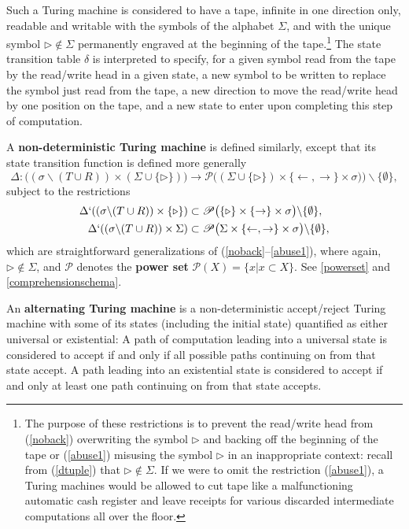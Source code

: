 \documentclass[letterpaper]{article}
\newcommand{\Axiom}{{\large\Bearing}}
\newcommand{\AxiomSchema}{{\large\LooseBearing}}
\begin{document}
\begin{remark}
Such a Turing machine is considered to have a tape, infinite in one direction only, readable and writable with the symbols of the alphabet $\Sigma$, and with the unique symbol \mbox{$\triangleright\notin\Sigma$} permanently engraved at the beginning of the tape.\footnote{The purpose of these restrictions is  to prevent the read/write head from (\ref{noback}) overwriting the symbol $\triangleright$ and backing off the beginning of the tape or (\ref{abuse1}) misusing the symbol $\triangleright$ in an inappropriate context: recall from (\ref{dtuple}) that \mbox{$\triangleright\notin\Sigma$}. If we were to omit the restriction (\ref{abuse1}), a Turing machines would be allowed to cut tape like a malfunctioning automatic cash register and leave receipts for various discarded intermediate computations all over the floor.}  The state transition table $\delta$ is interpreted to specify, for a given symbol read from the tape by the read/write head in a given state, a new symbol to be written to replace the symbol just read from the tape, a new direction to move the read/write head by one position on the tape, and a new state to enter upon completing this step of computation.
\end{remark}

\begin{definition}
A \textbf{non-deterministic Turing machine} is defined similarly, except that its state transition function is defined more generally
\begin{equation}
\Delta:\big((\sigma\backslash(T\cup R))\times(\Sigma\cup\{\triangleright\})\big)\longrightarrow\mathscr P\big((\Sigma\cup\{\triangleright\})\times\{\leftarrow,\rightarrow\}\times\sigma)\big)\backslash\{\emptyset\},
\end{equation}
subject to the restrictions
\begin{align}
\Delta`((\sigma\backslash(T\cup R))\times\{\triangleright\})&\subset\mathscr P\big(\{\triangleright\}\times\{\rightarrow\}\times\sigma\big)\backslash\{\emptyset\},\\
\Delta`((\sigma\backslash(T\cup R))\times\Sigma)&\subset\mathscr P \big(\Sigma\times\{\leftarrow,\rightarrow\}\times\sigma\big)\backslash\{\emptyset\},
\end{align}
which are straightforward generalizations of (\ref{noback}--\ref{abuse1}), where again, \mbox{$\triangleright\notin\Sigma$}, and $\mathscr P$ denotes the \textbf{power set} \mbox{$\mathscr P(X)=\{x|x\subset X\}$}.  See \Axiom \ref{powerset} and \AxiomSchema \ref{comprehensionschema}.
\end{definition}
\begin{definition}
An \textbf{alternating Turing machine} is a non-deterministic accept/reject Turing machine with some of its states (including the initial state) quantified as either universal or existential:  A path of computation leading into a universal state is considered to accept if and only if all possible paths continuing on from that state accept.  A path leading into an existential state is considered to accept if and only at least one path continuing on from that state accepts.
\end{definition}
\end{document}
